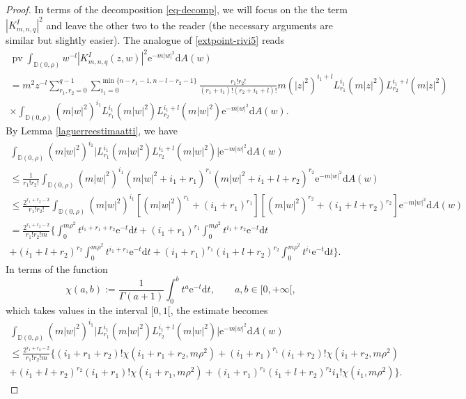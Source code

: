 \documentclass{birkart}
\theoremstyle{definition}
\theoremstyle{remark}
\numberwithin{equation}{section}
\numberwithin{figure}{section}
\newcommand{\e}{\mathrm e}
\newcommand{\1}{{\mathbf 1}}
\newcommand{\Rpar}{q}
\newcommand{\D}{{\mathbb D}}
\newcommand{\diff}{{\mathrm d}}
\newcommand{\pv}{\operatorname{\mathrm{pv}}}
\begin{document}
\begin{proof}
In terms of the decomposition \eqref{eq-decomp}, we will focus on the 
the term $|K^I_{m,n,q}|^2$ and leave the other two
to the reader (the necessary arguments are similar but slightly easier). 
The analogue of \eqref{extpoint-rivi5} reads
\begin{multline}
\label{eq-triv7}
\pv \int_{\D(0,\rho)} w^{-l} 
|K^I_{m,n,q}(z,w)|^2\e^{-m|w|^2} \diff A(w)
\\
= m^{2} z^{-l} \sum_{r_1,r_2=0}^{\Rpar-1}
\sum_{i_1=0}^{\min\{n-r_1-1,n-l-r_2-1\}}
\frac{r_1!r_2!}{(r_1+i_1)!(r_2+i_1+l)!}
m(|z|^2)^{i_1+l}L^{i_1}_{r_1}(m|z|^2)L^{i_1+l}_{r_2}(m|z|^2) 
\\
\times\int_{\D(0,\rho)} (m|w|^2)^{i_1}L^{i_1}_{r_1}(m|w|^2)
L^{i_1+l}_{r_2}(m|w|^2)\e^{-m|w|^2} \diff A(w). 
\end{multline}
By Lemma \ref{laguerreestimaatti}, we have
\begin{multline*}
\int_{\D(0,\rho)} (m|w|^2)^{i_1}\big|L^{i_1}_{r_1}(m|w|^2)
L^{i_1+l}_{r_2}(m|w|^2)\big|\e^{-m|w|^2} \diff A(w)
\\
\le\frac{1}{r_1!r_2!}\int_{\D(0,\rho)} (m|w|^2)^{i_1}(m|w|^2+i_1+r_1)^{r_1}
(m|w|^2+i_1+l+r_2)^{r_2}\e^{-m|w|^2} \diff A(w)
\\
\le
\frac{2^{r_1+r_2-2}}{r_1!r_2!}\int_{\D(0,\rho)} (m|w|^2)^{i_1}
[(m|w|^2)^{r_1}+(i_1+r_1)^{r_1}][
(m|w|^2)^{r_2}+(i_1+l+r_2)^{r_2}]\e^{-m|w|^2} \diff A(w)
\\
=\frac{2^{r_1+r_2-2}}{r_1!r_2!m}\Bigg\{
\int_0^{m\rho^2}t^{i_1+r_1+r_2}\e^{-t}\diff t+
(i_1+r_1)^{r_1}\int_0^{m\rho^2}t^{i_1+r_2}\e^{-t}\diff t
\\
+(i_1+l+r_2)^{r_2}\int_0^{m\rho^2}t^{i_1+r_1}\e^{-t}\diff t
+(i_1+r_1)^{r_1}(i_1+l+r_2)^{r_2}\int_0^{m\rho^2}t^{i_1}\e^{-t}\diff t\Bigg\}.
\end{multline*}
In terms of the function
\[
\chi(a,b):=\frac{1}{\Gamma(a+1)}\int_0^b t^a \e^{-t}\diff t,
\qquad a,b\in[0,+\infty[,
\]
which takes values in the interval $[0,1[$, the estimate becomes
\begin{multline*}
\int_{\D(0,\rho)} (m|w|^2)^{i_1}\big|L^{i_1}_{r_1}(m|w|^2)
L^{i_1+l}_{r_2}(m|w|^2)\big|\e^{-m|w|^2} \diff A(w)
\\
\le\frac{2^{r_1+r_2-2}}{r_1!r_2!m}\Bigg\{
(i_1+r_1+r_2)!\chi(i_1+r_1+r_2,m\rho^2)+
(i_1+r_1)^{r_1}(i_1+r_2)!\chi(i_1+r_2,m\rho^2)
\\
+(i_1+l+r_2)^{r_2}(i_1+r_1)!\chi(i_1+r_1,m\rho^2)
+(i_1+r_1)^{r_1}(i_1+l+r_2)^{r_2}i_1!\chi(i_1,m\rho^2)\Bigg\}.
\end{multline*}

\end{proof}
\end{document}
